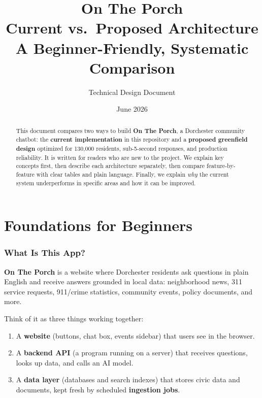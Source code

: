 \documentclass[11pt,a4paper]{article}
\title{\textbf{On The Porch}\\[0.4em]
\Large Current vs.\ Proposed Architecture\\
\large A Beginner-Friendly, Systematic Comparison}
\author{Technical Design Document}
\date{June 2026}
\begin{document}
\maketitle
\thispagestyle{fancy}

\begin{abstract}
This document compares two ways to build \textbf{On The Porch}, a Dorchester community chatbot: the \textbf{current implementation} in this repository and a \textbf{proposed greenfield design} optimized for 130,000 residents, sub-5-second responses, and production reliability. It is written for readers who are new to the project. We explain key concepts first, then describe each architecture separately, then compare feature-by-feature with clear tables and plain language. Finally, we explain \emph{why} the current system underperforms in specific areas and how it can be improved.
\end{abstract}

\tableofcontents
\newpage

\part{Foundations for Beginners}

\section{What Is This App?}

\textbf{On The Porch} is a website where Dorchester residents ask questions in plain English and receive answers grounded in local data: neighborhood news, 311 service requests, 911/crime statistics, community events, policy documents, and more.

Think of it as three things working together:
\begin{enumerate}[noitemsep]
  \item A \textbf{website} (buttons, chat box, events sidebar) that users see in the browser.
  \item A \textbf{backend API} (a program running on a server) that receives questions, looks up data, and calls an AI model.
  \item A \textbf{data layer} (databases and search indexes) that stores civic data and documents, kept fresh by scheduled \textbf{ingestion jobs}.
\end{enumerate}
\end{document}
